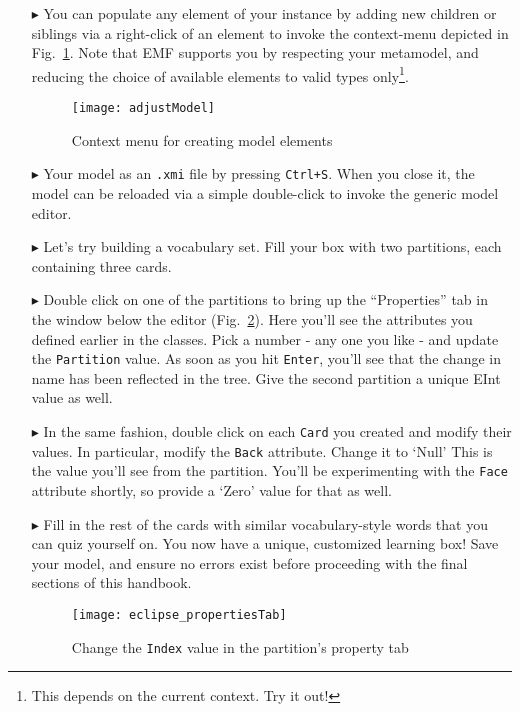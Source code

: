 \begin{itemize}
\clearpage

\item[$\blacktriangleright$] You can populate any element of your instance by adding new children or siblings via a right-click of an element to invoke the
context-menu depicted in Fig.~\ref{fig:create_instance}. Note that EMF supports you by respecting your metamodel, and reducing the choice of available elements
to valid types only\footnote{This depends on the current context. Try it out!}.

\begin{figure}[htbp]
	\centering
  \texttt{[image: adjustModel]}
	\caption{Context menu for creating model elements}
	\label{fig:create_instance}
\end{figure}

\item[$\blacktriangleright$] Your model as an \texttt{.xmi} file by pressing \texttt{Ctrl+S}. When you close it, the model can be reloaded via a simple
double-click to invoke the generic model editor.

\item[$\blacktriangleright$] Let's try building a vocabulary set. Fill your box with two partitions, each containing three cards.

\item[$\blacktriangleright$] Double click on one of the partitions to bring up the ``Properties'' tab in the window below the editor
(Fig.~\ref{fig:properties_partition}). Here you'll see the attributes you defined earlier in the classes. Pick a number - any one you like - and update the
\texttt{Partition} value. As soon as you hit \texttt{Enter}, you'll see that the change in name has been reflected in the tree. Give the second partition a
unique EInt value as well.

\item[$\blacktriangleright$] In the same fashion, double click on each \texttt{Card} you created and modify their values. In particular, modify the
\texttt{Back} attribute. Change it to `Null' This is the value you'll see from the partition. You'll be experimenting with the \texttt{Face} attribute shortly,
so provide a `Zero' value for that as well.

\item[$\blacktriangleright$] Fill in the rest of the cards with similar vocabulary-style words that you can quiz yourself on. You now have a unique, customized
learning box! Save your model, and ensure no errors exist before proceeding with the final sections of this handbook.

\newpage

\vspace*{4cm}

\begin{figure}[htbp]
	\centering
  \texttt{[image: eclipse\_propertiesTab]}
	\caption{Change the \texttt{Index} value in the partition's property tab}
	\label{fig:properties_partition}
\end{figure}


\end{itemize}
